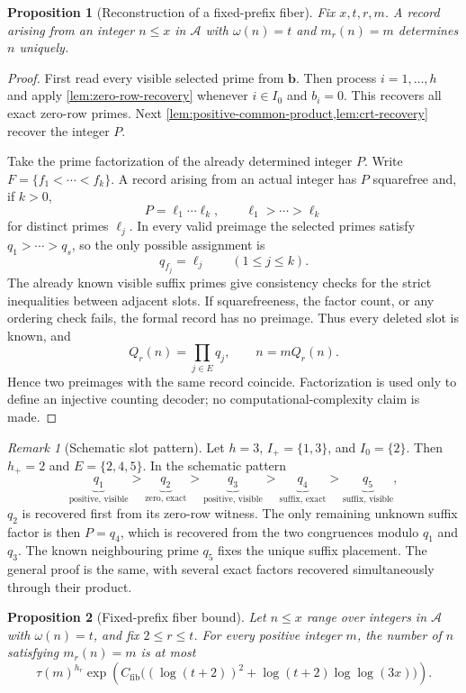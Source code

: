 \documentclass[11pt]{amsart}
\newtheorem{proposition}[proposition]{Proposition}
\theoremstyle{definition}
\theoremstyle{remark}
\newtheorem{remark}[remark]{Remark}
\numberwithin{equation}{section}
\newcommand{\Acal}{\mathcal A}
\begin{document}
\begin{proposition}[Reconstruction of a fixed-prefix fiber]
\label{prop:record-reconstruction}
Fix $x,t,r,m$.  A record arising from an integer $n\le x$ in $\Acal$
with $\omega(n)=t$ and $m_r(n)=m$ determines $n$ uniquely.
\end{proposition}

\begin{proof}
First read every visible selected prime from $\mathbf b$.  Then process
$i=1,\ldots,h$ and apply \cref{lem:zero-row-recovery} whenever
$i\in I_0$ and $b_i=0$.  This recovers all exact zero-row primes.
Next \cref{lem:positive-common-product,lem:crt-recovery} recover the
integer $P$.

Take the prime factorization of the already determined integer $P$.
Write $F=\{f_1<\cdots<f_k\}$.  A record arising from an actual integer has
$P$ squarefree and, if $k>0$,
\[
 P=\ell_1\cdots\ell_k,
 \qquad \ell_1>\cdots>\ell_k
\]
for distinct primes $\ell_j$.  In every valid preimage the selected primes
satisfy $q_1>\cdots>q_s$, so the only possible assignment is
\[
 q_{f_j}=\ell_j\qquad(1\le j\le k).
\]
The already known visible suffix primes give consistency checks for the
strict inequalities between adjacent slots.  If squarefreeness, the factor
count, or any ordering check fails, the formal record has no preimage.
Thus every deleted slot is known, and
\[
 Q_r(n)=\prod_{j\in E}q_j,
 \qquad n=mQ_r(n).
\]
Hence two preimages with the same record coincide.  Factorization is used
only to define an injective counting decoder; no computational-complexity
claim is made.
\end{proof}

\begin{remark}[Schematic slot pattern]\label{rem:schematic-record}
Let $h=3$, $I_+=\{1,3\}$, and $I_0=\{2\}$.  Then $h_+=2$ and
$E=\{2,4,5\}$.  In the schematic pattern
\[
 \underbrace{q_1}_{\text{positive, visible}}
 >\underbrace{q_2}_{\text{zero, exact}}
 >\underbrace{q_3}_{\text{positive, visible}}
 >\underbrace{q_4}_{\text{suffix, exact}}
 >\underbrace{q_5}_{\text{suffix, visible}},
\]
$q_2$ is recovered first from its zero-row witness.  The only remaining
unknown suffix factor is then $P=q_4$, which is recovered from the two
congruences modulo $q_1$ and $q_3$.  The known neighbouring prime $q_5$
fixes the unique suffix placement.  The general proof is the same, with
several exact factors recovered simultaneously through their product.
\end{remark}

\begin{proposition}[Fixed-prefix fiber bound]\label{prop:fixed-prefix-fiber}
Let $n\le x$ range over integers in $\Acal$ with $\omega(n)=t$, and fix
$2\le r\le t$.  For every positive integer $m$, the number of $n$ satisfying
$m_r(n)=m$ is at most
\[
 \tau(m)^{h_r}
 \exp\!\left(C_{\mathrm{fib}}\bigl((\log(t+2))^2+
 \log(t+2)\log\log(3x)\bigr)\right).
\]
\end{proposition}
\end{document}
